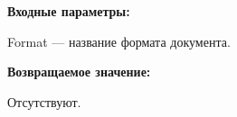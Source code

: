 \textbf{Входные параметры:}

Format --- название формата документа.

\textbf{Возвращаемое значение:}

Отсутствуют.